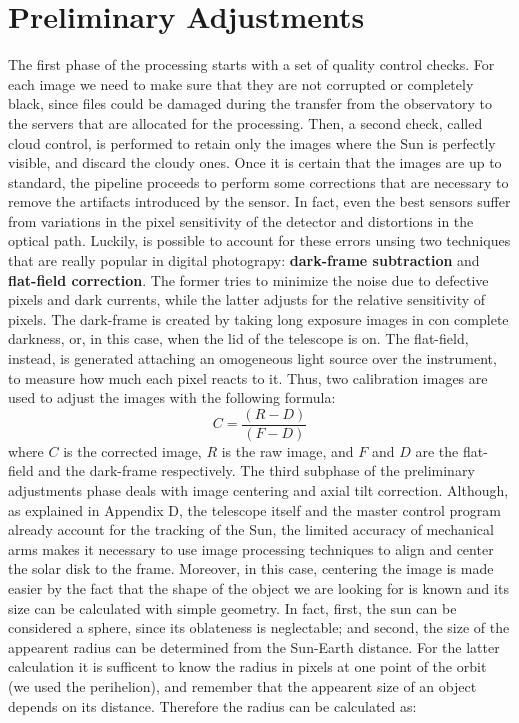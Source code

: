 \section{Preliminary Adjustments}
\noindent The first phase of the processing starts with a set of quality control checks. For each image we need to make sure that they are not corrupted or completely black, since files could be damaged during the transfer from the observatory to the servers that are allocated for the processing. Then, a second check, called cloud control, is performed to retain only the images where the Sun is perfectly visible, and discard the cloudy ones.
\bigbreak
\noindent Once it is certain that the images are up to standard, the pipeline proceeds to perform some corrections that are necessary to remove the artifacts introduced by the sensor. In fact, even the best sensors suffer from variations in the pixel sensitivity of the detector and distortions in the optical path. Luckily, is possible to account for these errors unsing two techniques that are really popular in digital photograpy: \textbf{dark-frame subtraction} and \textbf{flat-field correction}. The former tries to minimize the noise due to defective pixels and dark currents, while the latter adjusts for the relative sensitivity of pixels. The dark-frame is created by taking long exposure images in con complete darkness, or, in this case, when the lid of the telescope is on. The flat-field, instead, is generated attaching an omogeneous light source over the instrument, to measure how much each pixel reacts to it. Thus, two calibration images are used to adjust the images with the following formula:
\begin{equation}
C = \frac{(R - D)}{(F - D)}
\end{equation}
where $C$ is the corrected image, $R$ is the raw image, and $F$ and $D$ are the flat-field and the dark-frame respectively.
\bigbreak
\noindent The third subphase of the preliminary adjustments phase deals with image centering and axial tilt correction. Although, as explained in Appendix D, the telescope itself and the master control program already account for the tracking of the Sun, the limited accuracy of mechanical arms makes it necessary to use image processing techniques to align and center the solar disk to the frame. Moreover, in this case, centering the image is made easier by the fact that the shape of the object we are looking for is known and its size can be calculated with simple geometry. In fact, first, the sun can be considered a sphere, since its oblateness is neglectable; and second, the size of the appearent radius can be determined from the Sun-Earth distance. For the latter calculation it is sufficent to know the radius in pixels at one point of the orbit (we used the perihelion), and remember that the appearent size of an object depends on its distance. Therefore the radius can be calculated as:
